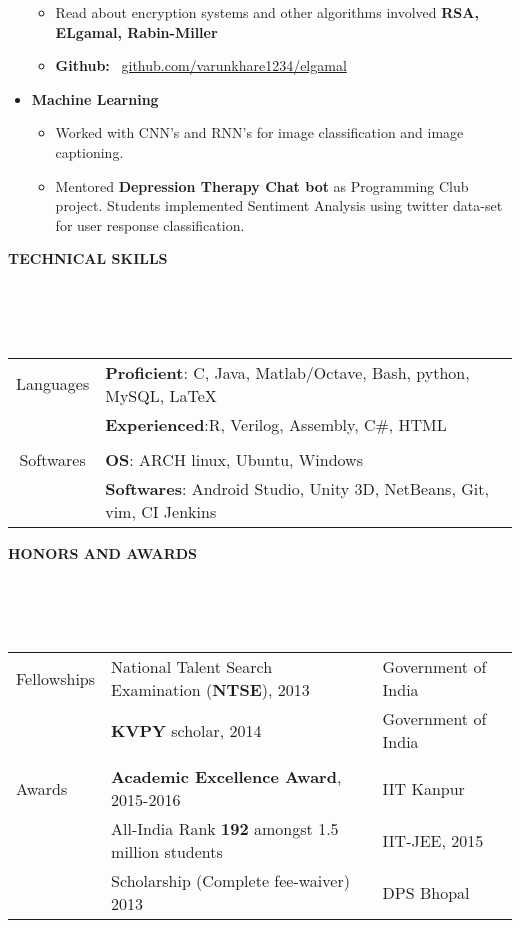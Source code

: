 \documentclass[a4paper,10pt]{article}
\newcommand{\lsep}{-0.5cm}
\newcommand{\resheading}[1]{{\small \colorbox{mygrey}{\begin{minipage}{0.975\textwidth}{\textbf{#1 \vphantom{p\^{E}}}}\end{minipage}}}}
\begin{document}
\begin{itemize}
\begin{itemize}
	\item Read about encryption systems and other algorithms involved \textbf{RSA, ELgamal, Rabin-Miller}
	\item \textbf{Github:} \ \href{https://github.com/varunkhare1234/elgamal}{github.com/varunkhare1234/elgamal}
	\end{itemize}
\item\textbf{Machine Learning}
    \begin{itemize}
    \item Worked with CNN's and RNN's for image classification and image captioning. 
    \item Mentored \textbf{Depression Therapy Chat bot} as Programming Club project. Students implemented Sentiment Analysis using twitter data-set for user response classification.
    \end{itemize}
\end{itemize}	

\resheading{\textbf{TECHNICAL SKILLS} }\\[\lsep]
\\ \\
\indent \begin{tabular}{c @{\hskip 0.3in}| @{\hskip 0.1in}l}
    Languages & \textbf{Proficient}: C, Java, Matlab/Octave, Bash, python, MySQL, \LaTeX \\
     & \textbf{Experienced}:R, Verilog, Assembly, C\#, HTML\\
     \\
     Softwares & \textbf{OS}: ARCH linux, Ubuntu, Windows\\
     & \textbf{Softwares}: Android Studio, Unity 3D, NetBeans, Git, vim, CI Jenkins
\end{tabular}

\resheading{\textbf{HONORS AND AWARDS} }\\[\lsep]
\\ \\
\indent \begin{tabular}{l@{\hskip 0.24in}| @{\hskip 0.1in} l @{\hskip 0.3in} l}
    Fellowships & National Talent Search Examination (\textbf{NTSE}), 2013 & Government of India\\
     &  \textbf{KVPY} scholar, 2014 & Government of India\\
     \\
     Awards & \textbf{Academic Excellence Award}, 2015-2016 & IIT Kanpur\\
     & All-India Rank \textbf{192} amongst 1.5 million students & IIT-JEE, 2015\\
     & Scholarship (Complete fee-waiver) 2013 & DPS Bhopal\\
\end{tabular}{}
\end{document}
